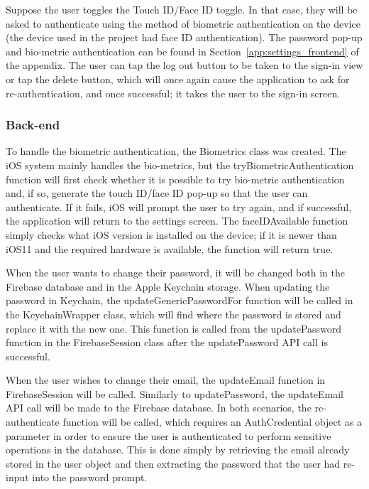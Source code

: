         Suppose the user toggles the Touch ID/Face ID toggle. In that case, they will be asked to authenticate using the method of biometric authentication on the device (the device used in the project had face ID authentication).  The password pop-up and bio-metric authentication can be found in Section~\ref{app:settings_frontend} of the appendix.  The user can tap the log out button to be taken to the sign-in view or tap the delete button, which will once again cause the application to ask for re-authentication, and once successful; it takes the user to the sign-in screen.
        
        \subsubsection{Back-end}
        To handle the biometric authentication, the Biometrics class was created.  The iOS system mainly handles the bio-metrics, but the tryBiometricAuthentication function will first check whether it is possible to try bio-metric authentication and, if so, generate the touch ID/face ID pop-up so that the user can authenticate.  If it fails, iOS will prompt the user to try again, and if successful, the application will return to the settings screen.  The faceIDAvailable function simply checks what iOS version is installed on the device; if it is newer than iOS11 and the required hardware is available, the function will return true.
        
        When the user wants to change their password, it will be changed both in the Firebase database and in the Apple Keychain storage.  When updating the password in Keychain, the updateGenericPasswordFor function will be called in the KeychainWrapper class, which will find where the password is stored and replace it with the new one.  This function is called from the updatePassword function in the FirebaseSession class after the updatePassword API call is successful.
        
        When the user wishes to change their email, the updateEmail function in FirebaseSession will be called. Similarly to updatePassword, the updateEmail API call will be made to the Firebase database.  In both scenarios, the re-authenticate function will be called, which requires an AuthCredential object as a parameter in order to ensure the user is authenticated to perform sensitive operations in the database.  This is done simply by retrieving the email already stored in the user object and then extracting the password that the user had re-input into the password prompt.
        
